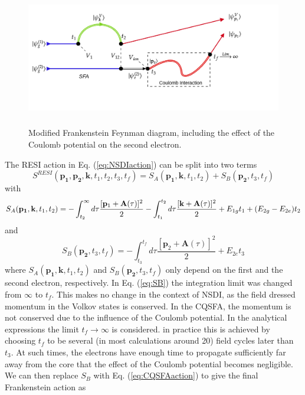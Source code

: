 \documentclass[11pt]{article}
\numberwithin{equation}{section}
\begin{document}
\begin{figure}[!htb]
    \centering
    \includegraphics[width = 14cm, height=6cm]{Figures/Frankenstein_feynman.png}
    \caption{Modified Frankenstein Feynman diagram, including the effect of the Coulomb potential on the second electron.}
    \label{fig:FRANK_feyn}
\end{figure}
\newline
The RESI action in Eq. (\ref{eq:NSDIaction}) can be split into two terms
\begin{equation}
    S^{RESI}(\mathbf{p_1}, \mathbf{p_2}, \mathbf{k}, t_1, t_2, t_3, t_f) = S_A(\mathbf{p_1},\mathbf{k}, t_1, t_2) + S_B(\mathbf{p_2},t_3, t_f)
\end{equation}
with 
\begin{equation}
    S_A(\mathbf{p_1},\mathbf{k}, t_1, t_2) = - \int_{t_2}^{\infty} d\tau \frac{[\mathbf{p}_1 + \mathbf{A}(\tau)]^2}{2} \\
    - \int_{t_1}^{t_2} d\tau \frac{[\mathbf{k} + \mathbf{A}(\tau)]^2}{2} + E_{1g}t_1 + (E_{2g} - E_{2e})t_2
\end{equation}
and
\begin{equation} \label{eq:SB}
    S_B(\mathbf{p_2},t_3, t_f) = -\int_{t_3}^{t_f} d\tau \frac{[\mathbf{p}_2+\mathbf{A}(\tau)]^2}{2} + E_{2e}t_3
\end{equation}
where $S_A(\mathbf{p_1},\mathbf{k}, t_1, t_2)$ and $S_B(\mathbf{p_2},t_3, t_f)$ only depend on the first and the second electron, respectively. In Eq. (\ref{eq:SB}) the integration limit was changed from $\infty$ to $t_f$. This makes no change in the context of NSDI, as the field dressed momentum in the Volkov states is conserved. In the CQSFA, the momentum is not conserved due to the influence of the Coulomb potential. In the analytical expressions the limit $t_f \rightarrow \infty$ is considered. in practice this is achieved by choosing $t_f$ to be several (in most calculations around 20) field cycles later than $t_3$. At such times, the electrons have enough time to propagate sufficiently far away from the core that the effect of the Coulomb potential becomes negligible. We can then replace $S_B$ with Eq. (\ref{eq:CQSFAaction}) to give the final Frankenstein action as
\end{document}
